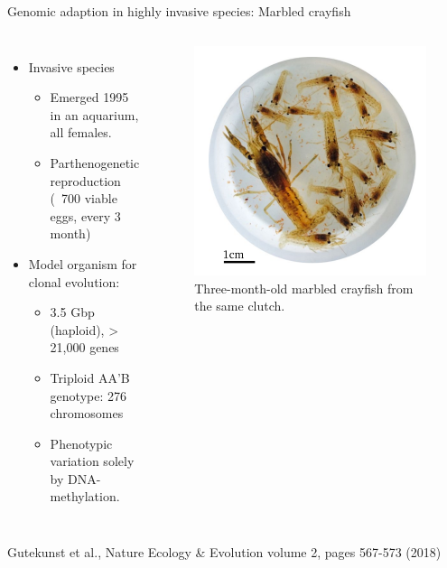 \documentclass[10pt]{beamer}
\newcommand{\credit}[1]{{\vspace{\fill} \par \raggedleft \scriptsize \mdseries \color{mDarkBrown} #1 \par}}
\begin{document}
\begin{frame}{Genomic adaption in highly invasive species: Marbled crayfish}
\begin{columns}
	\begin{itemize}
		\item Invasive species 
		\begin{itemize}
			\item Emerged 1995 in an aquarium, all females.
			\item Parthenogenetic reproduction \linebreak (~700 viable eggs, every 3 month)
		\end{itemize}
		\item Model organism for clonal evolution:
		\begin{itemize}
			\item 3.5 Gbp (haploid), >​21,000 genes
			\item Triploid AA’B genotype: 276 chromosomes
			\item Phenotypic variation solely by DNA-methylation.
		\end{itemize}
	\end{itemize}
	\begin{figure}
		\includegraphics[width=\textwidth]{figures/marmorkrebs.png}
		\caption{Three-month-old marbled crayfish from the same clutch.}
	\end{figure}
\end{columns}
\credit{Gutekunst et al., Nature Ecology \& Evolution volume 2, pages 567-573 (2018)}
\end{frame}
\end{document}

